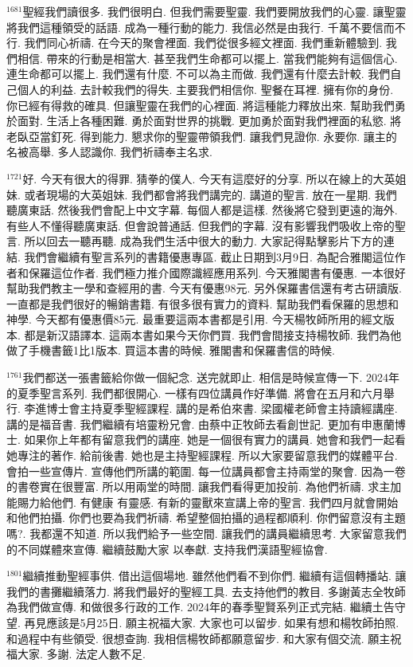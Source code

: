 \documentclass{book}
\begin{document}
$^{1681}$聖經我們讀很多.
我們很明白.
但我們需要聖靈.
我們要開放我們的心靈.
讓聖靈將我們這種領受的話語.
成為一種行動的能力.
我信必然是由我行.
千萬不要信而不行.
我們同心祈禱.
在今天的聚會裡面.
我們從很多經文裡面.
我們重新體驗到.
我們相信.
帶來的行動是相當大.
甚至我們生命都可以擺上.
當我們能夠有這個信心.
連生命都可以擺上.
我們還有什麼.
不可以為主而做.
我們還有什麼去計較.
我們自己個人的利益.
去計較我們的得失.
主要我們相信你.
聖餐在耳裡.
擁有你的身份.
你已經有得救的確具.
但讓聖靈在我們的心裡面.
將這種能力釋放出來.
幫助我們勇於面對.
生活上各種困難.
勇於面對世界的挑戰.
更加勇於面對我們裡面的私慾.
將老臥亞當釘死.
得到能力.
懇求你的聖靈帶領我們.
讓我們見證你.
永要你.
讓主的名被高舉.
多人認識你.
我們祈禱奉主名求.

$^{1721}$好.
今天有很大的得罪.
猜拳的僕人.
今天有這麼好的分享.
所以在線上的大英姐妹.
或者現場的大英姐妹.
我們都會將我們講完的.
講道的聖言.
放在一星期.
我們聽廣東話.
然後我們會配上中文字幕.
每個人都是這樣.
然後將它發到更遠的海外.
有些人不懂得聽廣東話.
但會說普通話.
但我們的字幕.
沒有影響我們吸收上帝的聖言.
所以回去一聽再聽.
成為我們生活中很大的動力.
大家記得點擊影片下方的連結.
我們會繼續有聖言系列的書籍優惠專區.
截止日期到3月9日.
為配合雅閣這位作者和保羅這位作者.
我們極力推介國際識經應用系列.
今天雅閣書有優惠.
一本很好幫助我們教主一學和查經用的書.
今天有優惠98元.
另外保羅書信還有考古研讀版.
一直都是我們很好的暢銷書籍.
有很多很有實力的資料.
幫助我們看保羅的思想和神學.
今天都有優惠價85元.
最重要這兩本書都是引用.
今天楊牧師所用的經文版本.
都是新汉語譯本.
這兩本書如果今天你們買.
我們會間接支持楊牧師.
我們為他做了手機書籤1比1版本.
買這本書的時候.
雅閣書和保羅書信的時候.

$^{1761}$我們都送一張書籤給你做一個紀念.
送完就即止.
相信是時候宣傳一下.
2024年的夏季聖言系列.
我們都很開心.
一樣有四位講員作好準備.
將會在五月和六月舉行.
李進博士會主持夏季聖經課程.
講的是希伯來書.
梁國權老師會主持讀經講座.
講的是福音書.
我們繼續有培靈粉兄會.
由蔡中正牧師去看創世記.
更加有申惠蘭博士.
如果你上年都有留意我們的講座.
她是一個很有實力的講員.
她會和我們一起看她專注的著作.
給前後書.
她也是主持聖經課程.
所以大家要留意我們的媒體平台.
會拍一些宣傳片.
宣傳他們所講的範圍.
每一位講員都會主持兩堂的聚會.
因為一卷的書卷實在很豐富.
所以用兩堂的時間.
讓我們看得更加投前.
為他們祈禱.
求主加能賜力給他們.
有健康 有靈感.
有新的靈獸來宣講上帝的聖言.
我們四月就會開始和他們拍攝.
你們也要為我們祈禱.
希望整個拍攝的過程都順利.
你們留意沒有主題嗎?.
我都還不知道.
所以我們給予一些空間.
讓我們的講員繼續思考.
大家留意我們的不同媒體來宣傳.
繼續鼓勵大家 以奉獻.
支持我們漢語聖經協會.

$^{1801}$繼續推動聖經事供.
借出這個場地.
雖然他們看不到你們.
繼續有這個轉播站.
讓我們的書攤繼續落力.
將我們最好的聖經工具.
去支持他們的教目.
多謝黃志全牧師為我們做宣傳.
和做很多行政的工作.
2024年的春季聖賢系列正式完結.
繼續土告守望.
再見應該是5月25日.
願主祝福大家.
大家也可以留步.
如果有想和楊牧師拍照.
和過程中有些領受.
很想查詢.
我相信楊牧師都願意留步.
和大家有個交流.
願主祝福大家.
多謝.
法定人數不足.
\newpage
\end{document}
